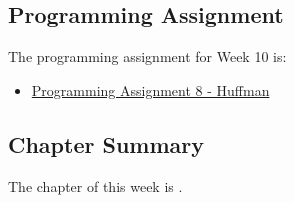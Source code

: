 \subsection{Programming Assignment}

The programming assignment for Week 10 is:

\begin{itemize}
    \item \href{https://github.com/QuantumCompiler/CU/tree/main/CSPB%202270%20-%20Data%20Structures/CSPB%202270%20-%20Programming%20Assignments/CSPB%202270%20-%20Assignment%208%20-%20Huffman%20Table}{Programming Assignment 8 - Huffman}
\end{itemize}

\subsection{Chapter Summary}

The chapter of this week is .

